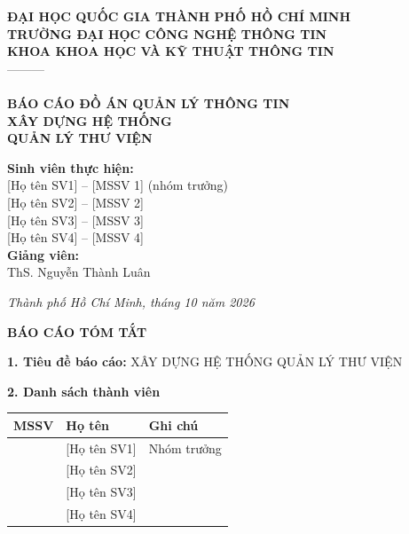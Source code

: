 \documentclass[13pt,a4paper,oneside]{extreport}
\begin{document}
\begin{titlepage}
\centering
{\bfseries ĐẠI HỌC QUỐC GIA THÀNH PHỐ HỒ CHÍ MINH\\
TRƯỜNG ĐẠI HỌC CÔNG NGHỆ THÔNG TIN\\
KHOA KHOA HỌC VÀ KỸ THUẬT THÔNG TIN\\}
---------\\[1.2cm]
\\[1.6cm]
{\bfseries\LARGE\color{xanh} BÁO CÁO ĐỒ ÁN QUẢN LÝ THÔNG TIN\\[0.8cm]
\Huge XÂY DỰNG HỆ THỐNG\\ QUẢN LÝ THƯ VIỆN\\}
\vspace{1.5cm}
\begin{flushleft}\hspace{3.2cm}\begin{minipage}{10cm}
\textbf{Sinh viên thực hiện:}\\
\hspace*{1cm}[Họ tên SV1] -- [MSSV 1] (nhóm trưởng)\\
\hspace*{1cm}[Họ tên SV2] -- [MSSV 2]\\
\hspace*{1cm}[Họ tên SV3] -- [MSSV 3]\\
\hspace*{1cm}[Họ tên SV4] -- [MSSV 4]\\[0.3cm]
\textbf{Giảng viên:}\\
\hspace*{1cm}ThS. Nguyễn Thành Luân
\end{minipage}\end{flushleft}
\vfill
{\itshape Thành phố Hồ Chí Minh, tháng 10 năm 2026}
\end{titlepage}

\setcounter{page}{2}
\begin{center}{\bfseries\Large\color{xanh} BÁO CÁO TÓM TẮT}\end{center}

\textbf{1. Tiêu đề báo cáo:} XÂY DỰNG HỆ THỐNG QUẢN LÝ THƯ VIỆN

\textbf{2. Danh sách thành viên}

\begin{center}\begin{tabular}{|p{3cm}|p{6.5cm}|p{3.5cm}|}\hline
\rowcolor{nenbang}\centering\textbf{MSSV} & \centering\textbf{Họ tên} & \centering\arraybackslash\textbf{Ghi chú}\\\hline
[MSSV 1] & [Họ tên SV1] & Nhóm trưởng\\\hline
[MSSV 2] & [Họ tên SV2] & \\\hline
[MSSV 3] & [Họ tên SV3] & \\\hline
[MSSV 4] & [Họ tên SV4] & \\\hline
\end{tabular}\end{center}
\end{document}
